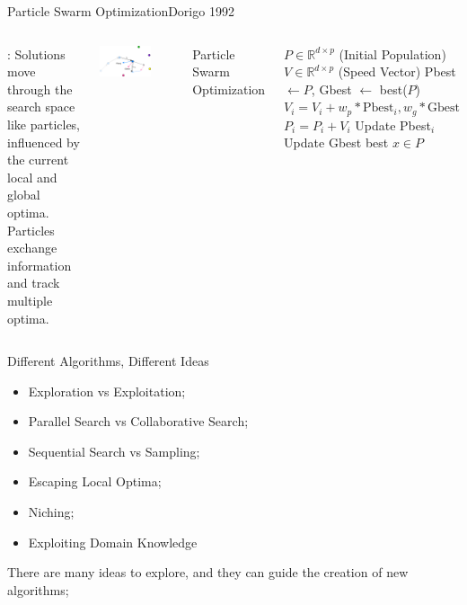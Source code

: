 \documentclass[aspectratio=169]{beamer}
\begin{document}
\begin{frame}{Particle Swarm Optimization}{Dorigo 1992}
  \begin{columns}
    : Solutions move through the search space like particles, influenced by the current local and global optima. Particles exchange information and track multiple optima.

    \begin{center}
      \includegraphics[width=0.7\textwidth]{img/PSO.png}
    \end{center}

      Particle Swarm Optimization\bigskip

      \begin{algorithmic}[1]
        \Require $P \in \mathbb{R}^{d\times p}$ (Initial Population)
        \Require $V \in \mathbb{R}^{d\times p}$ (Speed Vector)
          \State Pbest $\gets P$, Gbest $\gets$ best($P$)
          \State $V_i = V_i + w_p*\text{Pbest}_i, w_g*\text{Gbest}$
          \State $P_i = P_i + V_i$
          \State Update Pbest$_i$
          \EndFor
          \State Update Gbest
        \EndWhile
         best $x \in P$
      \end{algorithmic}
  \end{columns}
\end{frame}

\begin{frame}{Different Algorithms, Different Ideas}
  \begin{itemize}
    \item Exploration vs Exploitation;
    \item Parallel Search vs Collaborative Search;
    \item Sequential Search vs Sampling;
    \item Escaping Local Optima;
    \item Niching;
    \item Exploiting Domain Knowledge
  \end{itemize}
  \vfill

  There are many ideas to explore, and they can guide the creation of new algorithms;
\end{frame}
\end{document}
